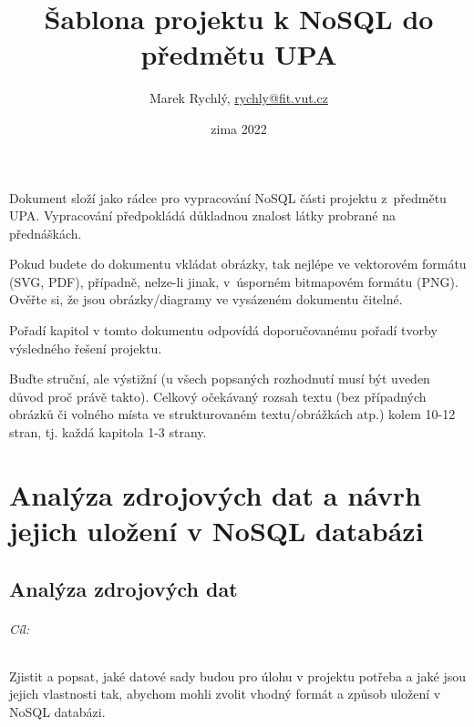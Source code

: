 \documentclass[10pt,xcolor=pdflatex,dvipsnames,table,oneside]{book}
\author{Marek Rychlý, \href{mailto:rychly@fit.vut.cz}{rychly@fit.vut.cz}}
\title{Šablona projektu k NoSQL do předmětu UPA}
\date{zima 2022}
\begin{document}

\hypersetup{pageanchor=false}%
\maketitle
\hypersetup{pageanchor=true}

Dokument složí jako rádce pro vypracování NoSQL části projektu z~předmětu UPA.
Vypracování předpokládá důkladnou znalost látky probrané na přednáškách.

Pokud budete do dokumentu vkládat obrázky, tak nejlépe ve vektorovém formátu (SVG, PDF), případně, nelze-li jinak, v~úsporném bitmapovém formátu (PNG).
Ověřte si, že jsou obrázky/diagramy ve vysázeném dokumentu čitelné.

Pořadí kapitol v tomto dokumentu odpovídá doporučovanému pořadí tvorby výsledného řešení projektu.

Buďte struční, ale výstižní (u všech popsaných rozhodnutí musí být uveden důvod proč právě takto).
Celkový očekávaný rozsah textu (bez případných obrázků či volného místa ve strukturovaném textu/obrážkách atp.) kolem 10-12 stran, tj. každá kapitola 1-3 strany.

\tableofcontents

\newpage%

\part{Analýza zdrojových dat a návrh jejich uložení v NoSQL databázi}

\chapter{Analýza zdrojových dat}

\paragraph{Cíl:}
Zjistit a popsat, jaké datové sady budou pro úlohu v projektu potřeba a jaké jsou jejich vlastnosti tak,
abychom mohli zvolit vhodný formát a způsob uložení v NoSQL databázi.
\end{document}
